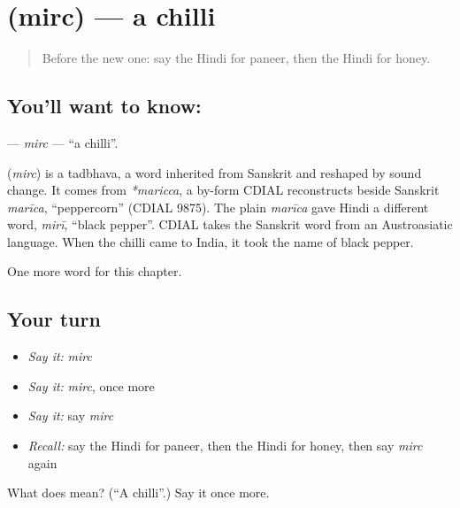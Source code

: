 \section[\texorpdfstring{\hi{मिर्च} (mirc)}{मिर्च (mirc)}]{ (mirc) — a chilli}

\label{lesson:HI-C141-mirc}



\begin{quote}
Before the new one: say the Hindi for paneer, then the Hindi for honey.
\end{quote}

\subsection*{You'll want to know: }
\textbf{} — \emph{mirc} — \textquotedblleft{}a chilli\textquotedblright{}.

\begin{cousinweb}
\textbf{} (\emph{mirc}) is a tadbhava, a word inherited from Sanskrit and reshaped by sound change. It comes from \emph{*maricca}, a by-form CDIAL reconstructs beside Sanskrit \emph{marīca}, \textquotedblleft{}peppercorn\textquotedblright{} (CDIAL 9875). The plain \emph{marīca} gave Hindi a different word, \emph{mirī}, \textquotedblleft{}black pepper\textquotedblright{}. CDIAL takes the Sanskrit word from an Austroasiatic language. When the chilli came to India, it took the name of black pepper.
\end{cousinweb}

\begin{grammarlens}[title={What you've built}]
One more word for this chapter.
\end{grammarlens}

\subsection*{Your turn}
\begin{itemize}
\raggedright
  \item \emph{Say it:} \emph{mirc}
  \item \emph{Say it:} \emph{mirc}, once more
  \item \emph{Say it:} say \emph{mirc}
  \item \emph{Recall:} say the Hindi for paneer, then the Hindi for honey, then say \emph{mirc} again
\end{itemize}

\begin{tcolorbox}[breakable,colback=teal!4,colframe=teal!35!black,title={Before you move on}]
What does  mean? (\textquotedblleft{}A chilli\textquotedblright{}.) Say it once more.
\end{tcolorbox}
